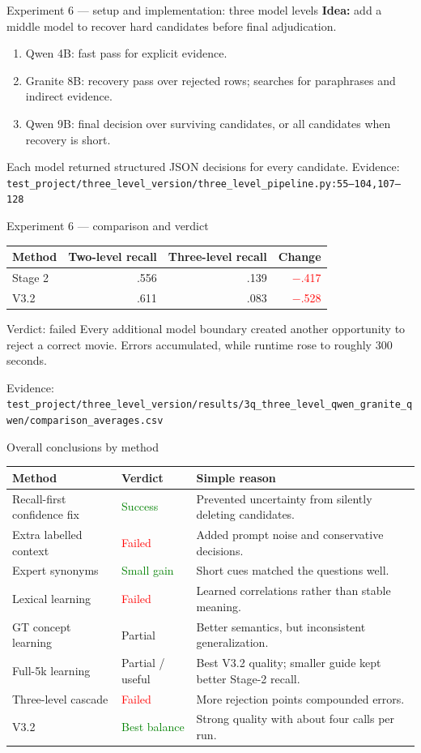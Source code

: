 \documentclass[aspectratio=169,10pt]{beamer}
\newcommand{\yes}[1]{\textcolor{green}{#1}}\newcommand{\no}[1]{\textcolor{red}{#1}}\newcommand{\key}[1]{\textcolor{yellow}{#1}}
\newcommand{\citecode}[1]{\vfill{\color{soft}\tiny Evidence: \texttt{#1}}}
\begin{document}
\begin{frame}{Experiment 6 --- setup and implementation: three model levels}
\textbf{Idea:} add a middle model to recover hard candidates before final adjudication.
\begin{enumerate}
\item Qwen 4B: fast pass for explicit evidence.
\item Granite 8B: recovery pass over rejected rows; searches for paraphrases and indirect evidence.
\item Qwen 9B: final decision over surviving candidates, or all candidates when recovery is short.
\end{enumerate}
Each model returned structured JSON decisions for every candidate.
\citecode{test\_project/three\_level\_version/three\_level\_pipeline.py:55--104,107--128}
\end{frame}

\begin{frame}{Experiment 6 --- comparison and verdict}
\centering
\begin{tabular}{lrrr}\toprule Method & Two-level recall & Three-level recall & Change\\\midrule
Stage 2 & .556 & .139 & \no{$-$.417}\\
V3.2 & .611 & .083 & \no{$-$.528}\\\bottomrule\end{tabular}
\vfill
\begin{block}{Verdict: failed}
Every additional model boundary created another opportunity to reject a correct movie. Errors accumulated, while runtime rose to roughly 300 seconds.
\end{block}
\citecode{test\_project/three\_level\_version/results/3q\_three\_level\_qwen\_granite\_qwen/comparison\_averages.csv}
\end{frame}

\begin{frame}{Overall conclusions by method}
\small\begin{tabular}{p{3.1cm}p{1.7cm}p{6.1cm}}\toprule Method & Verdict & Simple reason\\\midrule
Recall-first confidence fix & \yes{Success} & Prevented uncertainty from silently deleting candidates.\\
Extra labelled context & \no{Failed} & Added prompt noise and conservative decisions.\\
Expert synonyms & \yes{Small gain} & Short cues matched the questions well.\\
Lexical learning & \no{Failed} & Learned correlations rather than stable meaning.\\
GT concept learning & Partial & Better semantics, but inconsistent generalization.\\
Full-5k learning & Partial / useful & Best V3.2 quality; smaller guide kept better Stage-2 recall.\\
Three-level cascade & \no{Failed} & More rejection points compounded errors.\\
V3.2 & \yes{Best balance} & Strong quality with about four calls per run.\\\bottomrule\end{tabular}
\end{frame}
\end{document}
